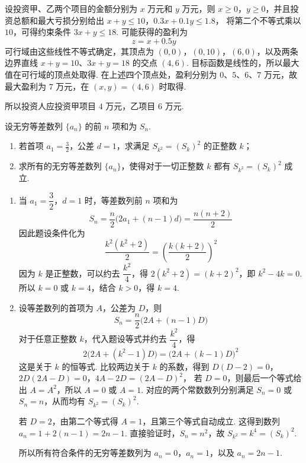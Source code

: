 \begin{solution}
设投资甲、乙两个项目的金额分别为 \(x\) 万元和 \(y\) 万元，则 \(x\geqslant0\)，\(y\geqslant0\)，并且投资总额和最大亏损分别给出
\(x+y\leqslant10\)，\(0.3x+0.1y\leqslant1.8\)，
将第二个不等式乘以 \(10\)，可得约束条件 \(3x+y\leqslant18\). 可能获得的盈利为
\[
z=x+0.5y
\]
可行域由这些线性不等式确定，其顶点为 \((0,0)\)，\((0,10)\)，\((6,0)\)，以及两条边界直线 \(x+y=10\)、\(3x+y=18\) 的交点 \((4,6)\). 目标函数是线性的，所以最大值在可行域的顶点处取得. 在上述四个顶点处，盈利分别为 \(0\)、\(5\)、\(6\)、\(7\) 万元，故最大盈利为 \(7\) 万元，在 \((x,y)=(4,6)\) 时取得.

所以投资人应投资甲项目 \(4\) 万元，乙项目 \(6\) 万元.
\end{solution}

\begin{problem}
设无穷等差数列 \(\{a_{n}\}\) 的前 \(n\) 项和为 \(S_{n}\).

\begin{enumerate}
\item 若首项 \(a_1 = \frac{3}{2}\)，公差 \(d = 1\)，求满足 \(S_{k^2} = (S_k)^2\) 的正整数 \(k\)；
\item 求所有的无穷等差数列 \(\{a_{n}\}\)，使得对于一切正整数 \(k\) 都有 \(S_{k^2} = (S_k)^2\) 成立.
\end{enumerate}
\end{problem}

\begin{solution}
\begin{enumerate}
\item 当 \(a_1=\dfrac32\)，\(d=1\) 时，等差数列前 \(n\) 项和为
\[
S_n=\frac n2\bigl(2a_1+(n-1)d\bigr)=\frac{n(n+2)}2
\]
因此题设条件化为
\[
\frac{k^2(k^2+2)}2=\left(\frac{k(k+2)}2\right)^2
\]
因为 \(k\) 是正整数，可以约去 \(\dfrac{k^2}{4}\)，得 \(2(k^2+2)=(k+2)^2\)，即 \(k^2-4k=0\). 所以 \(k=0\) 或 \(k=4\)，结合 \(k>0\)，得 \(k=4\).

\item 设等差数列的首项为 \(A\)，公差为 \(D\)，则
\[
S_n=\frac n2\bigl(2A+(n-1)D\bigr)
\]
对于任意正整数 \(k\)，代入题设等式并约去 \(\dfrac{k^2}{4}\)，得
\[
2\bigl(2A+(k^2-1)D\bigr)=\bigl(2A+(k-1)D\bigr)^2
\]
这是关于 \(k\) 的恒等式. 比较两边关于 \(k\) 的系数，得到
\(D(D-2)=0\)，\(2D(2A-D)=0\)，\(4A-2D=(2A-D)^2\)，
若 \(D=0\)，则最后一个等式给出 \(A=A^2\)，所以 \(A=0\) 或 \(A=1\). 对应的两个常数数列分别满足 \(S_n=0\) 或 \(S_n=n\)，从而均有 \(S_{k^2}=(S_k)^2\).

若 \(D=2\)，由第二个等式得 \(A=1\)，且第三个等式自动成立. 这得到数列 \(a_n=1+2(n-1)=2n-1\). 直接验证时，\(S_n=n^2\)，故 \(S_{k^2}=k^4=(S_k)^2\).

所以所有符合条件的无穷等差数列为 \(a_n=0\)，\(a_n=1\)，以及 \(a_n=2n-1\).
\end{enumerate}
\end{solution}

